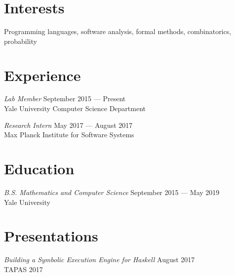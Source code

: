 \documentclass[margin]{res}
\begin{document}
 

 
\address{{\bf Address} \\ 17 Broadway 2L \\ New Haven, CT 06511}
 
\address{{\bf Contact} \\ \texttt{anton.xue@yale.edu} \\ (617) 755-5257}

\begin{resume} 
 
\section{Interests} 
Programming languages, software analysis, formal methods, combinatorics, probability

\section{Experience}
\textit{Lab Member} \hfill September 2015 --- Present \\
Yale University Computer Science Department

\textit{Research Intern} \hfill May 2017 --- August 2017 \\
Max Planck Institute for Software Systems

\section{Education} 
\textit{B.S. Mathematics and Computer Science} \hfill September 2015 --- May 2019 \\
Yale University



\section{Presentations}
\textit{Building a Symbolic Execution Engine for Haskell} \hfill August 2017 \\
TAPAS 2017


\end{resume}
\end{document}
